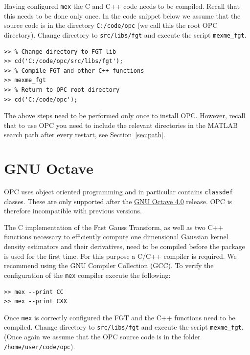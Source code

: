 \documentclass{book}
\begin{document}
\noindent
%
Having configured {\tt mex} the C and C++ code needs to be compiled.
Recall that this needs to be done only once. 
%
In the code snippet below we assume that the source code
is in the directory {\tt C:/code/opc} (we call this the root OPC directory).
%
Change directory to {\tt src/libs/fgt} and execute the script {\tt mexme\_fgt}.

\begin{verbatim}
>> % Change directory to FGT lib
>> cd('C:/code/opc/src/libs/fgt');
>> % Compile FGT and other C++ functions
>> mexme_fgt
>> % Return to OPC root directory
>> cd('C:/code/opc');
\end{verbatim}

\noindent
%
The above steps need to be performed only once to install OPC. However, recall
that to use OPC you need to include the relevant directories in the MATLAB
search path after every restart, see Section~\ref{sec:path}.


\section{GNU Octave}\label{sec:Octave}

OPC uses object oriented programming and in particular contains {\tt classdef}
classes. These are only supported after the
%
\href{https://octave.org/doc/v4.2.2/classdef-Classes.html#classdef-Classes}
{GNU Octave 4.0}
%
release. OPC is therefore incompatible with previous versions.



The C implementation of the Fast Gauss Transform, as well as two
C++ functions necessary to efficiently compute one dimensional Gaussian kernel density
estimators and their derivatives, need to be compiled before the package
is used for the first time. For this purpose a C/C++ compiler is required. 
We recommend using the GNU Compiler Collection (GCC). 
%
To verify the configuration of the {\tt mex} compiler execute the following:

\begin{verbatim}
>> mex --print CC
>> mex --print CXX
\end{verbatim}

\noindent
%
Once {\tt mex} is correctly configured the FGT and the C++ functions need to be
compiled. Change directory to {\tt src/libs/fgt} and execute the script {\tt mexme\_fgt}.
(Once again we assume that the OPC source code is in the folder {\tt /home/user/code/opc}).
\end{document}

